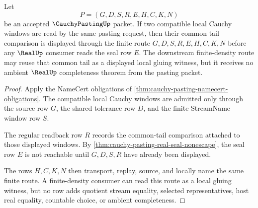 \begin{theorem}
\label{thm:cauchy-pasting-common-tail-gluing}
Let
$$
P=(G,D,S,R,E,H,C,K,N)
$$
be an accepted $\CauchyPastingUp$ packet. If two compatible local Cauchy windows are read by the same pasting request, then their common-tail comparison is displayed through the finite route $G,D,S,R,E,H,C,K,N$ before any $\RealUp$ consumer reads the seal row $E$. The downstream finite-density route may reuse that common tail as a displayed local gluing witness, but it receives no ambient $\RealUp$ completeness theorem from the pasting packet.
\end{theorem}
\begin{proof}
Apply the NameCert obligations of \autoref{thm:cauchy-pasting-namecert-obligations}. The compatible local Cauchy windows are admitted only through the source row $G$, the shared tolerance row $D$, and the finite StreamName window row $S$.

The regular readback row $R$ records the common-tail comparison attached to those displayed windows. By \autoref{thm:cauchy-pasting-real-seal-nonescape}, the seal row $E$ is not reachable until $G,D,S,R$ have already been displayed.

The rows $H,C,K,N$ then transport, replay, source, and locally name the same finite route. A finite-density consumer can read this route as a local gluing witness, but no row adds quotient stream equality, selected representatives, host real equality, countable choice, or ambient completeness.
\end{proof}

